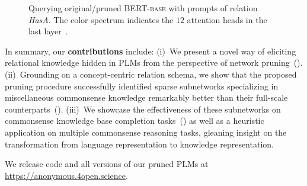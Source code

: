 \begin{figure}[t]
	\centering
	\caption{Querying original/pruned \textsc{BERT-base} with prompts of relation \textit{HasA}. The color spectrum indicates the $12$ attention heads in the last layer~\citep{DBLP:journals/corr/abs-1904-02679}.} \label{fig:LAMA}
\end{figure}


In summary, our \textbf{contributions} include:
(i)~We present a novel way of eliciting relational knowledge hidden in PLMs from the perspective of network pruning~(). (ii)~Grounding on a concept-centric relation schema, we show that the proposed pruning procedure successfully identified sparse subnetworks specializing in miscellaneous commonsense knowledge remarkably better than their full-scale counterparts~(). (iii)~We showcase the effectiveness of these subnetworks on commonsense knowledge base completion tasks~() as well as a heuristic application on multiple commonsense reasoning tasks, gleaning insight on the transformation from language representation to knowledge representation.

We release code and all versions of our pruned PLMs at \url{https://anonymous.4open.science}.

